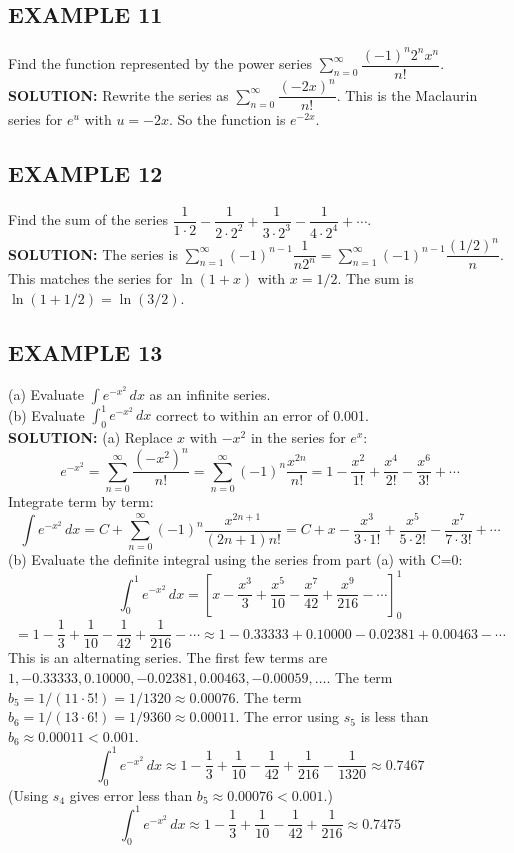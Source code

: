 \documentclass{article}
\theoremstyle{mystyle}
\begin{document}
\subsection*{EXAMPLE 11}
Find the function represented by the power series \( \sum_{n=0}^{\infty} \dfrac{(-1)^n 2^n x^n}{n!} \).\\
\textbf{SOLUTION:}
Rewrite the series as \( \sum_{n=0}^{\infty} \dfrac{(-2x)^n}{n!} \). This is the Maclaurin series for \(e^u\) with \(u=-2x\). So the function is \(e^{-2x}\).

\subsection*{EXAMPLE 12}
Find the sum of the series \( \dfrac{1}{1 \cdot 2} - \dfrac{1}{2 \cdot 2^2} + \dfrac{1}{3 \cdot 2^3} - \dfrac{1}{4 \cdot 2^4} + \cdots \).\\
\textbf{SOLUTION:}
The series is \( \sum_{n=1}^{\infty} (-1)^{n-1} \dfrac{1}{n 2^n} = \sum_{n=1}^{\infty} (-1)^{n-1} \dfrac{(1/2)^n}{n} \).
This matches the series for \(\ln(1+x)\) with \(x=1/2\).
The sum is \(\ln(1 + 1/2) = \ln(3/2)\).

\subsection*{EXAMPLE 13}
(a) Evaluate \( \int e^{-x^2} \,dx \) as an infinite series. \\
(b) Evaluate \( \int_0^1 e^{-x^2} \,dx \) correct to within an error of 0.001.\\
\textbf{SOLUTION:}
(a) Replace \(x\) with \(-x^2\) in the series for \(e^x\):
\[ e^{-x^2} = \sum_{n=0}^{\infty} \dfrac{(-x^2)^n}{n!} = \sum_{n=0}^{\infty} (-1)^n \dfrac{x^{2n}}{n!} = 1 - \dfrac{x^2}{1!} + \dfrac{x^4}{2!} - \dfrac{x^6}{3!} + \cdots \]
Integrate term by term:
\[ \int e^{-x^2} \,dx = C + \sum_{n=0}^{\infty} (-1)^n \dfrac{x^{2n+1}}{(2n+1)n!} = C + x - \dfrac{x^3}{3 \cdot 1!} + \dfrac{x^5}{5 \cdot 2!} - \dfrac{x^7}{7 \cdot 3!} + \cdots \]
(b) Evaluate the definite integral using the series from part (a) with C=0:
\[ \int_0^1 e^{-x^2} \,dx = \left[ x - \dfrac{x^3}{3} + \dfrac{x^5}{10} - \dfrac{x^7}{42} + \dfrac{x^9}{216} - \cdots \right]_0^1 \]
\[ = 1 - \dfrac{1}{3} + \dfrac{1}{10} - \dfrac{1}{42} + \dfrac{1}{216} - \cdots \approx 1 - 0.33333 + 0.10000 - 0.02381 + 0.00463 - \cdots \]
This is an alternating series. The first few terms are \(1, -0.33333, 0.10000, -0.02381, 0.00463, -0.00059, \ldots\).
The term \(b_5 = 1/(11 \cdot 5!) = 1/1320 \approx 0.00076\).
The term \(b_6 = 1/(13 \cdot 6!) = 1/9360 \approx 0.00011\).
The error using \(s_5\) is less than \(b_6 \approx 0.00011 < 0.001\).
\[ \int_0^1 e^{-x^2} \,dx \approx 1 - \dfrac{1}{3} + \dfrac{1}{10} - \dfrac{1}{42} + \dfrac{1}{216} - \dfrac{1}{1320} \approx 0.7467 \]
(Using \(s_4\) gives error less than \(b_5 \approx 0.00076 < 0.001\).)
\[ \int_0^1 e^{-x^2} \,dx \approx 1 - \dfrac{1}{3} + \dfrac{1}{10} - \dfrac{1}{42} + \dfrac{1}{216} \approx 0.7475 \]
\end{document}
